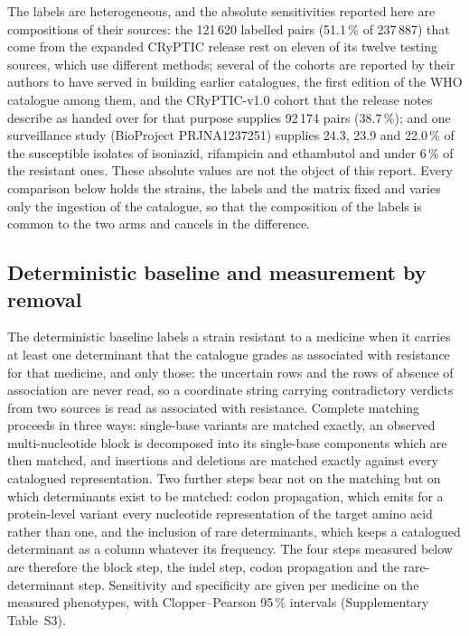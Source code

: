 \documentclass[11pt]{article}
\begin{document}
The labels are heterogeneous, and the absolute sensitivities reported here are
compositions of their sources: the 121\,620 labelled pairs (51.1\,\% of 237\,887) that come
from the expanded CRyPTIC release rest on eleven of its twelve testing sources, which use
different methods; several of the cohorts are reported by their authors to have served in
building earlier catalogues, the first edition of the WHO catalogue among them, and the
CRyPTIC-v1.0 cohort that the release notes \cite{cryptic2026dataset} describe as handed over for that purpose supplies
92\,174 pairs (38.7\,\%); and one surveillance study (BioProject PRJNA1237251) supplies 24.3,
23.9 and 22.0\,\% of the susceptible isolates of isoniazid, rifampicin and ethambutol and under
6\,\% of the resistant ones. These absolute values are not the
object of this report. Every comparison below holds the strains, the labels and the matrix
fixed and varies only the ingestion of the catalogue, so that the composition of the
labels is common to the two arms and cancels in the difference.

\subsection{Deterministic baseline and measurement by removal}
The deterministic baseline labels a strain resistant to a medicine when it carries at least
one determinant that the catalogue grades as associated with resistance for that medicine,
and only those: the uncertain rows and the rows of absence of association are never read, so
a coordinate string carrying contradictory verdicts from two sources is read as associated
with resistance. Complete matching proceeds in three ways: single-base variants are matched
exactly, an observed multi-nucleotide block is decomposed into its single-base components
which are then matched, and insertions and deletions are matched exactly against every
catalogued representation. Two further steps bear not on the matching but on which
determinants exist to be matched: codon propagation, which emits for a protein-level variant
every nucleotide representation of the target amino acid rather than one, and the inclusion of
rare determinants, which keeps a catalogued determinant as a column whatever its frequency.
The four steps measured below are therefore the block step, the indel step, codon propagation
and the rare-determinant step. Sensitivity and specificity are given per medicine on the
measured phenotypes, with Clopper--Pearson 95\,\% intervals (Supplementary Table~S3).
\end{document}
